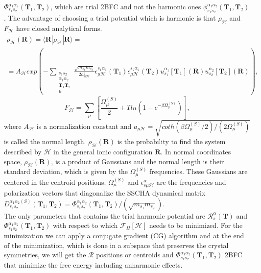 $\Phi_{s_{1}s_{2}}^{\alpha_{1}\alpha_{2}}(\mathbf{T}_{1},\mathbf{T}_{2})$, which are trial 2BFC and not the harmonic ones $\phi_{s_{1}s_{2}}^{\alpha_{1}\alpha_{2}}(\mathbf{T}_{1},\mathbf{T}_{2})$. The advantage of choosing a 
trial potential which is harmonic is that $\rho_{\mathcal{H}}$ and $F_{\mathcal{H}}$ have closed analytical forms. 
\begin{multline}
 \label{gaussian_sscha}
 \rho_{\mathcal{H}}(\mathbf{R})=\langle\mathbf{R}|\rho_{\mathcal{H}}|\mathbf{R}\rangle=\\=A_{\mathcal{H}}exp\left(-\sum\limits_{\substack{s_{1}s_{2} \\ \alpha_{1}\alpha_{2} \\ \mathbf{T}_{1}\mathbf{T}_{2} \\ \mu}}\frac{\sqrt{
	 m_{s_{1}}m_{s_{2}}}}{2a_{\mu\mathcal{H}}^{2}}\epsilon_{\mu\mathcal{H}}^{s_{1}\alpha_{1}}(\mathbf{T}_{1})\epsilon_{\mu\mathcal{H}}^{s_{2}\alpha_{2}}(\mathbf{T}_{2})u_{s_{1}}^{\alpha_{1}}[\mathbf{T}_{1}](\mathbf{
 R})u_{s_{2}}^{\alpha_{2}}[\mathbf{T}_{2}](\mathbf{R})\right),
\end{multline}
\begin{equation}
	F_{\mathcal{H}}=\sum_{\mu}\left[\frac{\Omega^{(S)}_{\mu}}{2}+Tln\left(1-e^{-\beta\Omega^{(S)}_{\mu}}\right)\right],
\end{equation}
where $A_{\mathcal{H}}$ is a normalization constant and $a_{\mu\mathcal{H}}=\sqrt{coth(\beta\Omega^{(S)}_{\mu}/2)/(2\Omega^{(S)}_{\mu})}$ is called the normal length. $\rho_{\mathcal{H}}(\mathbf{R})$ 
is the probability to find the system described by $\mathcal{H}$ in the general ionic configuration $\mathbf{R}$. In normal coordinates space, $\rho_{\mathcal{H}}(\mathbf{R})$, is a product of Gaussians and the normal length 
is their standard deviation, which is given by the $\Omega_{\mu}^{(S)}$ frequencies. These Gaussians are centered in the centroid positions. $\Omega^{(S)}_{\mu}$ and $\epsilon_{s\mu\mathcal{H}}^{\alpha}$ are the frequencies and polarization vectors that diagonalize the SSCHA dynamical matrix $D_{s_{1}s_{2}}^{\alpha_{1}\alpha_{2}(S)}(\mathbf{T}_{1},\mathbf{T}_{2})=\Phi_{s_{1}s_{2}}^{\alpha_{1}\alpha_{2}}(\mathbf{T}_{1},\mathbf{T}_{2})/(\sqrt{m_{s_{1}}m_{s_{2}}})$. \\

The only parameters that contains the trial harmonic potential are $\mathcal{R}_{s}^{\alpha}(\mathbf{T})$ and $\Phi_{s_{1}s_{2}}^{\alpha_{1}\alpha_{2}}(\mathbf{T}_{1},\mathbf{T}_{2})$ with respect to 
which $\mathcal{F}_{H}[\mathcal{H}]$ needs to be minimized. For the minimization we can apply a conjugate gradient (CG) algorithm and at the end of the minimization, which is done in a subspace that 
preserves the crystal symmetries, we will get the $\boldsymbol{\mathcal{R}}$ positions or centroids and $\Phi_{s_{1}s_{2}}^{\alpha_{1}\alpha_{2}}(\mathbf{T}_{1},\mathbf{T}_{2})$ 2BFC that minimize 
the free energy including anharmonic effects. \\

